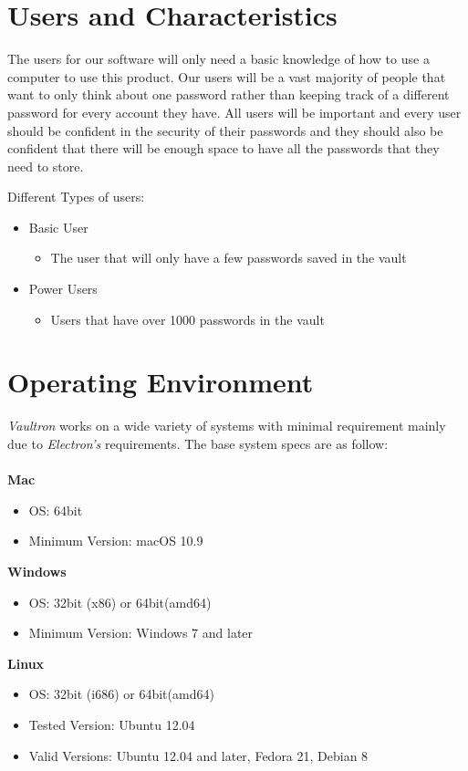\documentclass[11pt]{report}
\begin{document}
\section{Users and Characteristics}
The users for our software will only need a basic knowledge of how to use 
a computer to use this product. Our users will be a vast majority of people 
that want to only think about one password rather than keeping track of a 
different password for every account they have. All users will be important 
and every user should be confident in the security of their passwords and 
they should also be confident that there will be enough space to have all 
the passwords that they need to store.

Different Types of users:
\begin{itemize}
    \item Basic User
        \begin{itemize}
            \item The user that will only have a few passwords saved in the vault
        \end{itemize}
    \item Power Users
        \begin{itemize}
            \item Users that have over 1000 passwords in the vault
        \end{itemize}
\end{itemize}


\section{Operating Environment}
\textit{Vaultron} works on a wide variety of systems with minimal requirement 
mainly due to \textit{Electron's} requirements. The base system specs are as follow:
\\ \\ 
\textbf{Mac}
\begin{itemize}
    \item OS: 64bit
    \item Minimum Version: macOS 10.9
\end{itemize}

\textbf{Windows}
\begin{itemize}
    \item OS: 32bit (x86) or 64bit(amd64)
    \item Minimum Version: Windows 7 and later
\end{itemize}

\textbf{Linux}
\begin{itemize}
    \item OS: 32bit (i686) or 64bit(amd64)
    \item Tested Version: Ubuntu 12.04 
    \item Valid Versions: Ubuntu 12.04 and later, Fedora 21, Debian 8
\end{itemize}
\end{document}
